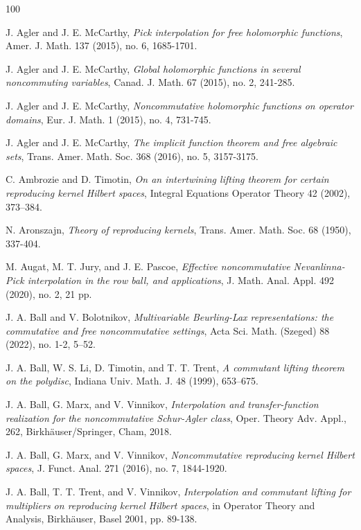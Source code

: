 \documentclass[12pt]{amsart}%
\numberwithin{equation}{section}
\begin{document}
\begin{thebibliography}{100}

 J. Agler and J. E. McCarthy, {\em Pick interpolation for free holomorphic functions}, Amer. J. Math. 137 (2015), no. 6, 1685-1701.

 J. Agler and J. E. McCarthy, {\em Global holomorphic functions in several noncommuting variables}, Canad. J. Math. 67 (2015), no. 2, 241-285.

 J. Agler and J. E. McCarthy, {\em Noncommutative holomorphic functions on operator domains}, Eur. J. Math. 1 (2015), no. 4, 731-745.

 J. Agler and J. E. McCarthy, {\em The implicit function theorem and free algebraic sets}, Trans. Amer. Math. Soc. 368 (2016), no. 5, 3157-3175.

 C. Ambrozie and D. Timotin, {\em On an intertwining lifting theorem for certain reproducing kernel Hilbert spaces}, Integral Equations Operator Theory 42 (2002), 373–384.



 N. Aronszajn, {\em Theory of reproducing kernels}, Trans. Amer. Math. Soc. 68 (1950), 337-404.

 M. Augat, M. T. Jury, and J. E. Pascoe, 
{\em Effective noncommutative Nevanlinna-Pick interpolation in the row ball, and applications}, J. Math. Anal. Appl. 492 (2020), no. 2, 21 pp.

 J. A. Ball and V. Bolotnikov,
{\em Multivariable Beurling-Lax representations: the commutative and free noncommutative settings}, Acta Sci. Math. (Szeged) 88 (2022), no. 1-2, 5–52.

 J. A. Ball, W. S. Li, D. Timotin, and T. T. Trent, {\em A commutant lifting theorem on the polydisc}, Indiana Univ. Math. J. 48 (1999), 653–675.

 J. A. Ball, G. Marx, and V. Vinnikov, {\em Interpolation and transfer-function realization for the noncommutative Schur-Agler class}, Oper. Theory Adv. Appl., 262, Birkhäuser/Springer, Cham, 2018.

 J. A. Ball, G. Marx, and V. Vinnikov, {\em Noncommutative reproducing kernel Hilbert spaces}, J. Funct. Anal. 271 (2016), no. 7, 1844-1920.
 


 J. A. Ball, T. T. Trent, and V. Vinnikov, {\em Interpolation and commutant lifting for multipliers on reproducing kernel Hilbert spaces}, in Operator Theory and Analysis, Birkhäuser, Basel 2001, pp. 89-138.



\end{thebibliography}
\end{document}

